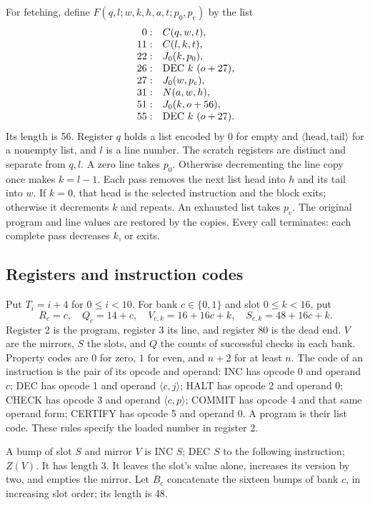 \documentclass[11pt,twoside]{article}
\theoremstyle{thielethm}
\theoremstyle{thieledef}
\theoremstyle{thieledef}
\theoremstyle{thieledef}
\theoremstyle{thielethm}
\theoremstyle{thieleobs}
\theoremstyle{thielethm}
\begin{document}
For fetching, define $F(q,l;w,k,h,a,t;p_0,p_e)$ by the list
\[
\begin{array}{r l}
0:&C(q,w,t),\\
11:&C(l,k,t),\\
22:&J_0(k,p_0),\\
26:&\mathrm{DEC}\ k\ (o+27),\\
27:&J_0(w,p_e),\\
31:&N(a,w,h),\\
51:&J_0(k,o+56),\\
55:&\mathrm{DEC}\ k\ (o+27).
\end{array}
\]
Its length is 56. Register $q$ holds a list encoded by 0 for empty and
$\langle\text{head},\text{tail}\rangle$ for a nonempty list, and $l$ is a line number.
The scratch registers are distinct and separate from $q,l$. A zero line takes $p_0$.
Otherwise decrementing the line copy once makes $k=l-1$. Each pass removes the next
list head into $h$ and its tail into $w$. If $k=0$, that head is the selected
instruction and the block exits; otherwise it decrements $k$ and repeats.
An exhausted list takes $p_e$. The original program and line values are restored by
the copies. Every call terminates: each complete pass decreases $k$, or exits.

\subsection{Registers and instruction codes}

Put $T_i=i+4$ for $0\le i<10$. For bank $c\in\{0,1\}$ and slot $0\le k<16$, put
\[
R_c=c,\quad Q_c=14+c,\quad V_{c,k}=16+16c+k,\quad S_{c,k}=48+16c+k.
\]
Register 2 is the program, register 3 its line, and register 80 is the dead end.
$V$ are the mirrors, $S$ the slots, and $Q$ the counts of successful checks in each bank.
Property codes are $0$ for zero, $1$ for even, and $n+2$ for at least $n$.
The code of an instruction is the pair of its opcode and operand:
INC has opcode 0 and operand $c$; DEC has opcode 1 and operand $\langle c,j\rangle$;
HALT has opcode 2 and operand 0; CHECK has opcode 3 and operand $\langle c,p\rangle$;
COMMIT has opcode 4 and that same operand form; CERTIFY has opcode 5 and operand 0.
A program is their list code. These rules specify the loaded number in register 2.

A bump of slot $S$ and mirror $V$ is INC $S$; DEC $S$ to the following instruction;
$Z(V)$. It has length 3. It leaves the slot's value alone, increases its version by
two, and empties the mirror. Let $B_c$ concatenate the sixteen bumps of bank $c$,
in increasing slot order; its length is 48.
\end{document}
